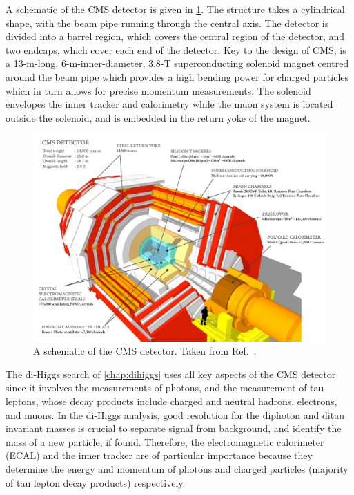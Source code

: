 A schematic of the CMS detector is given in \cref{fig:cms_detector}. The structure takes a cylindrical shape, with the beam pipe running through the central axis. The detector is divided into a barrel region, which covers the central region of the detector, and two endcaps, which cover each end of the detector. Key to the design of CMS, is a 13-\unit{m}-long, 6-\unit{m}-inner-diameter, 3.8-\unit{T} superconducting solenoid magnet centred around the beam pipe which provides a high bending power for charged particles which in turn allows for precise momentum measurements. The solenoid envelopes the inner tracker and calorimetry while the muon system is located outside the solenoid, and is embedded in the return yoke of the magnet. 

\begin{figure}
  \centering
  \includegraphics[width=\textwidth]{Figures/Detector/CMS/cms_detector.pdf}
  \caption[A Schematic of the CMS Detector]{A schematic of the CMS detector. Taken from Ref.~\cite{Sakuma:2013jqa}.}\label{fig:cms_detector}
\end{figure}

The di-Higgs search of \cref{chap:dihiggs} uses all key aspects of the CMS detector since it involves the measurements of photons, and the measurement of tau leptons, whose decay products include charged and neutral hadrons, electrons, and muons. In the di-Higgs analysis, good resolution for the diphoton and ditau invariant masses is crucial to separate signal from background, and identify the mass of a new particle, if found. Therefore, the electromagnetic calorimeter (ECAL) and the inner tracker are of particular importance because they determine the energy and momentum of photons and charged particles (majority of tau lepton decay products) respectively.